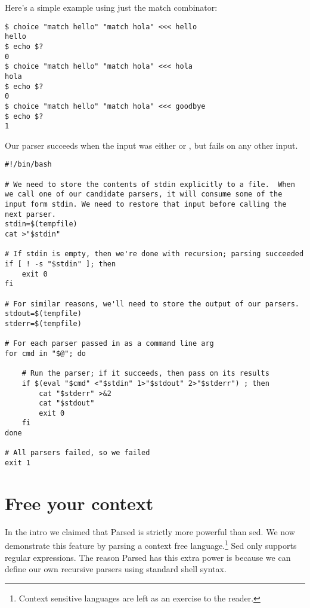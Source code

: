 \documentclass{sigplanconf}
\newcommand{\sh}[1]{{\ttfamily {#1}}}
\begin{document}
Here's a simple example using just the match combinator:
\begin{lstlisting}
$ choice "match hello" "match hola" <<< hello
hello
$ echo $?
0
$ choice "match hello" "match hola" <<< hola
hola
$ echo $?
0
$ choice "match hello" "match hola" <<< goodbye
$ echo $?
1
\end{lstlisting}
Our parser succeeds when the input was either \sh{hello} or \sh{hola}, but fails on any other input.

\begin{algorithm}
\caption{\sh{choice}}
\label{alg:choice}
\begin{lstlisting}
#!/bin/bash

# We need to store the contents of stdin explicitly to a file.  When we call one of our candidate parsers, it will consume some of the input form stdin. We need to restore that input before calling the next parser.
stdin=$(tempfile)
cat >"$stdin"

# If stdin is empty, then we're done with recursion; parsing succeeded
if [ ! -s "$stdin" ]; then
    exit 0
fi

# For similar reasons, we'll need to store the output of our parsers.
stdout=$(tempfile)
stderr=$(tempfile)

# For each parser passed in as a command line arg
for cmd in "$@"; do

    # Run the parser; if it succeeds, then pass on its results
    if $(eval "$cmd" <"$stdin" 1>"$stdout" 2>"$stderr") ; then
        cat "$stderr" >&2
        cat "$stdout"
        exit 0
    fi
done

# All parsers failed, so we failed
exit 1
\end{lstlisting}
\end{algorithm}


\section{Free your context}
In the intro we claimed that Parsed is strictly more powerful than sed.
We now demonstrate this feature by parsing a context free language.\footnote{Context sensitive languages are left as an exercise to the reader.}
Sed only supports regular expressions.
The reason Parsed has this extra power is because we can define our own recursive parsers using standard shell syntax.
\end{document}
